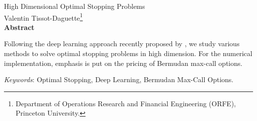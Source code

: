 \begin{center}
\phantom{coucou}

\vspace{1.5cm}
    \huge  High Dimensional Optimal Stopping Problems \\
    \vspace{0.4cm}
    \large   Valentin Tissot-Daguette\footnote[2]{Department of Operations Research and Financial Engineering (ORFE), Princeton University.}\\
\vspace{1cm}
\textbf{Abstract}
\end{center}
\vspace{-3mm}
Following the deep learning approach recently proposed by \cite{Becker}, we study various methods to solve optimal stopping problems in high dimension.  For the numerical implementation, emphasis is put on the pricing of Bermudan max-call options.

\begin{flushleft}
 \textit{Keywords}: Optimal Stopping, Deep Learning, Bermudan Max-Call Options.
 \end{flushleft}

\renewcommand{\thefootnote}{\arabic{footnote}}